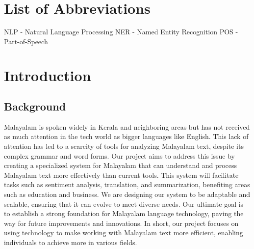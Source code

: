 \documentclass[12pt,a4paper,titlepage]{report}
\begin{document}
	
	\listoffigures
	\newpage
	
	
	\listoftables
	\newpage
	
	\chapter*{List of Abbreviations}
	
	NLP - Natural Language Processing
	\newline
	NER - Named Entity Recognition
	\newline
	POS - Part-of-Speech
	
	
	
	
	\newpage
	
	\cleardoublepage
	
	\setcounter{page}{1}
	\chapter{Introduction}
	
	\section{Background}
	
	Malayalam is spoken widely in Kerala and neighboring areas but has not received as much attention in the tech world as bigger languages like English. This lack of attention has led to a scarcity of tools for analyzing Malayalam text, despite its complex grammar and word forms.
	\newline
	Our project aims to address this issue by creating a specialized system for Malayalam that can understand and process Malayalam text more effectively than current tools. This system will facilitate tasks such as sentiment analysis, translation, and summarization, benefiting areas such as education and business.
	\newline
	We are designing our system to be adaptable and scalable, ensuring that it can evolve to meet diverse needs. Our ultimate goal is to establish a strong foundation for Malayalam language technology, paving the way for future improvements and innovations.
	\newline
	In short, our project focuses on using technology to make working with Malayalam text more efficient, enabling individuals to achieve more in various fields.
	
\end{document}
